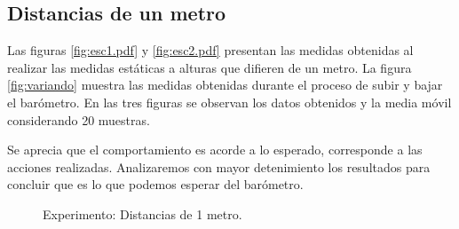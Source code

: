 \documentclass[spanish,12pt,a4paper,titlepage]{report}
\begin{document}
\newpage
\subsection{Distancias de un metro}

Las figuras \ref{fig:esc1.pdf} y \ref{fig:esc2.pdf} presentan las medidas obtenidas al realizar las medidas estáticas a alturas que difieren de un metro. La figura \ref{fig:variando} muestra las medidas obtenidas durante el proceso de subir y bajar el barómetro. En las tres figuras se observan los datos obtenidos y la media móvil considerando 20 muestras.

Se aprecia que el comportamiento es acorde a lo esperado, corresponde a las acciones realizadas. Analizaremos con mayor detenimiento los resultados para concluir que es lo que podemos esperar del barómetro.

\vspace{-25pt}
\begin{figure}[H]
\hspace{-70pt}
\vspace{-10pt}
  \caption{Experimento: Distancias de 1 metro.}
\label{fig:1m}
\end{figure}
\end{document}
